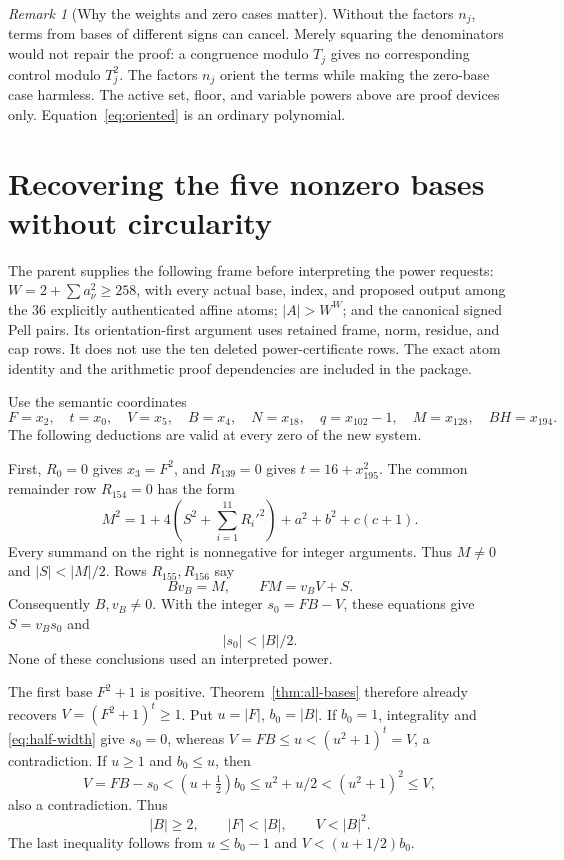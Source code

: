 \documentclass[11pt]{article}
\theoremstyle{definition}\newtheorem{definition}[theorem]{Definition}
\theoremstyle{remark}\newtheorem{remark}[theorem]{Remark}
\begin{document}
\begin{remark}[Why the weights and zero cases matter]
Without the factors $n_j$, terms from bases of different signs can
cancel. Merely squaring the denominators would not repair the proof:
a congruence modulo $T_j$ gives no corresponding control modulo $T_j^2$.
The factors $n_j$ orient the terms while making the zero-base case
harmless. The active set, floor, and variable powers above are proof
devices only. Equation~\eqref{eq:oriented} is an ordinary polynomial.
\end{remark}

\section{Recovering the five nonzero bases without circularity}
\label{sec:bootstrap}

The parent supplies the following frame before interpreting the power
requests: $W=2+\sum a_\nu^2\ge258$, with every actual base, index,
and proposed output among the 36 explicitly authenticated affine atoms;
$|A|>W^W$; and the canonical signed Pell pairs. Its orientation-first
argument uses retained frame, norm, residue, and cap rows. It does not
use the ten deleted power-certificate rows. The exact atom identity and
the arithmetic proof dependencies are included in the package.

Use the semantic coordinates
\[
F=x_2,\quad t=x_0,\quad V=x_5,\quad B=x_4,\quad
N=x_{18},\quad q=x_{102}-1,\quad M=x_{128},\quad BH=x_{194}.
\]
The following deductions are valid at every zero of the new system.

First, $R_0=0$ gives $x_3=F^2$, and $R_{139}=0$ gives
$t=16+x_{195}^2$. The common remainder row $R_{154}=0$ has the form
\begin{equation}
M^2=1+4\left(S^2+\sum_{i=1}^{11}R_i'^2\right)
+a^2+b^2+c(c+1).
\label{eq:normalization}
\end{equation}
Every summand on the right is nonnegative for integer arguments. Thus
$M\ne0$ and $|S|<|M|/2$. Rows $R_{155},R_{156}$ say
\[
Bv_B=M,\qquad FM=v_BV+S.
\]
Consequently $B,v_B\ne0$. With the integer $s_0=FB-V$, these equations
give $S=v_Bs_0$ and
\begin{equation}|s_0|<|B|/2.\label{eq:half-width}\end{equation}
None of these conclusions used an interpreted power.

The first base $F^2+1$ is positive. Theorem~\ref{thm:all-bases} therefore
already recovers $V=(F^2+1)^t\ge1$. Put $u=|F|$, $b_0=|B|$.
If $b_0=1$, integrality and \eqref{eq:half-width} give $s_0=0$,
whereas $V=FB\le u<(u^2+1)^t=V$, a contradiction. If $u\ge1$ and
$b_0\le u$, then
\[
V=FB-s_0<(u+\tfrac12)b_0
\le u^2+u/2<(u^2+1)^2\le V,
\]
also a contradiction. Thus
\begin{equation}
|B|\ge2,\qquad |F|<|B|,\qquad V<|B|^2.
\label{eq:bootstrap-bounds}
\end{equation}
The last inequality follows from $u\le b_0-1$ and
$V<(u+1/2)b_0$.
\end{document}

